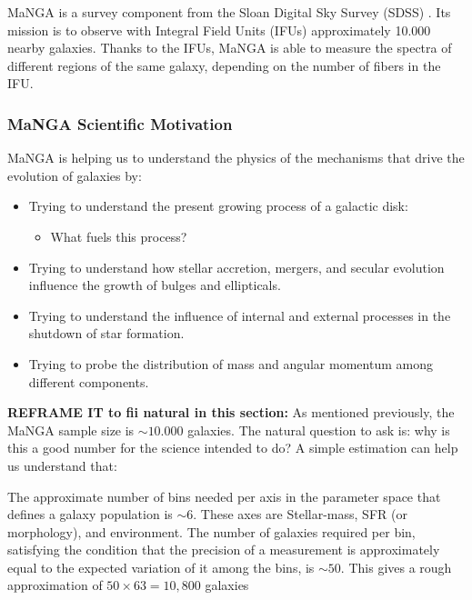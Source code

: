 MaNGA is a survey component from the Sloan Digital Sky Survey (SDSS) \citep{bundy2015, ahumada2020}. Its mission is to observe with Integral Field Units (IFUs) approximately 10.000 nearby galaxies. Thanks to the IFUs, MaNGA is able to measure the spectra of different regions of the same galaxy, depending on the number of fibers in the IFU.

\subsubsection{MaNGA Scientific Motivation}

MaNGA is helping us to understand the physics of the mechanisms that drive the evolution of galaxies by:

\begin{itemize}

  \item Trying to understand the present growing process of a galactic disk:

  \begin{itemize}
    \item What fuels this process?
  \end{itemize}

  \item Trying to understand how stellar accretion, mergers, and secular evolution influence the growth of bulges and ellipticals.

  \item Trying to understand the influence of internal and external processes in the shutdown of star formation.
  
  \item Trying to probe the distribution of mass and angular momentum among different components.
\end{itemize}

\textbf{REFRAME IT to fii natural in this section:} As mentioned previously, the MaNGA sample size is $\sim 10.000$ galaxies. The natural question to ask is: why is this a good number for the science intended to do? A simple estimation can help us understand that:

The approximate number of bins needed per axis in the parameter space that defines a galaxy population is $\sim 6$. These axes are Stellar-mass, SFR (or morphology), and environment. The number of galaxies required per bin, satisfying the condition that the precision of a measurement is approximately equal to the expected variation of it among the bins, is $\sim 50$. This gives a rough approximation of $50 \times 63 = 10,800$ galaxies

